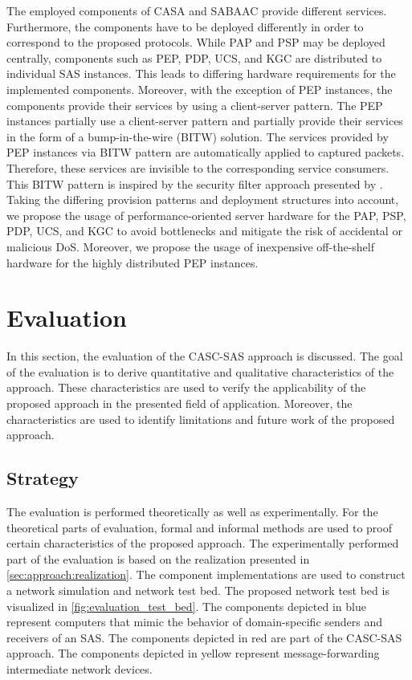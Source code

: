 The employed components of CASA and SABAAC provide different services.
Furthermore, the components have to be deployed differently in order to correspond to the proposed protocols.
While PAP and PSP may be deployed centrally, components such as PEP, PDP, UCS, and KGC are distributed to individual SAS instances.
This leads to differing hardware requirements for the implemented components.
Moreover, with the exception of PEP instances, the components provide their services by using a client-server pattern.
The PEP instances partially use a client-server pattern and partially provide their services in the form of a bump-in-the-wire (BITW) solution.
The services provided by PEP instances via BITW pattern are automatically applied to captured packets.
Therefore, these services are invisible to the corresponding service consumers.
This BITW pattern is inspired by the security filter approach presented by \citeauthor{Ishchenko2018} \cite{Ishchenko2018}.
Taking the differing provision patterns and deployment structures into account, we propose the usage of performance-oriented server hardware for the PAP, PSP, PDP, UCS, and KGC to avoid bottlenecks and mitigate the risk of accidental or malicious DoS.
Moreover, we propose the usage of inexpensive off-the-shelf hardware for the highly distributed PEP instances.

\section{Evaluation}
\label{sec:approach:evaluation}
In this section, the evaluation of the CASC-SAS approach is discussed.
The goal of the evaluation is to derive quantitative and qualitative characteristics of the approach.
These characteristics are used to verify the applicability of the proposed approach in the presented field of application.
Moreover, the characteristics are used to identify limitations and future work of the proposed approach.

\subsection{Strategy}
The evaluation is performed theoretically as well as experimentally.
For the theoretical parts of evaluation, formal and informal methods are used to proof certain characteristics of the proposed approach.
The experimentally performed part of the evaluation is based on the realization presented in \autoref{sec:approach:realization}.
The component implementations are used to construct a network simulation and network test bed.
The proposed network test bed is visualized in \autoref{fig:evaluation_test_bed}.
The components depicted in blue represent computers that mimic the behavior of domain-specific senders and receivers of an SAS.
The components depicted in red are part of the CASC-SAS approach.
The components depicted in yellow represent message-forwarding intermediate network devices.


